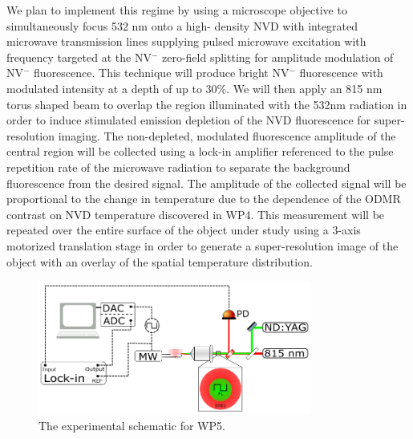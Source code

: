 	We plan to implement this regime by using a microscope objective to simultaneously focus 532 nm onto a high-
density NVD with integrated microwave transmission lines supplying pulsed microwave excitation with frequency 
targeted at the NV$^-$ zero-field splitting for amplitude modulation of NV$^-$ fluorescence.  This technique 
will produce bright NV$^-$ fluorescence with modulated intensity at a depth of up to 30\%.  We will then apply 
an 815 nm torus shaped beam to overlap the region illuminated with the 532nm radiation in order to induce 
stimulated emission depletion of the NVD fluorescence for super-resolution imaging.  The non-depleted, modulated 
fluorescence amplitude of the central region will be collected using a lock-in amplifier referenced to the pulse 
repetition rate of the microwave radiation to separate the background fluorescence from the desired signal.  The 
amplitude of the collected signal will be proportional to the change in temperature due to the dependence of the 
ODMR contrast on NVD temperature discovered in WP4.  This measurement will be repeated over the entire surface 
of the object under study using a 3-axis motorized translation stage in order to generate a super-resolution 
image of the object with an overlay of the spatial temperature distribution. 

\begin{figure}
\centering
\includegraphics[width=0.8\textwidth]{Figures/WP5Schematic.png}
\caption{The experimental schematic for WP5.}
\label{WP5rSchematic}
\end{figure}

